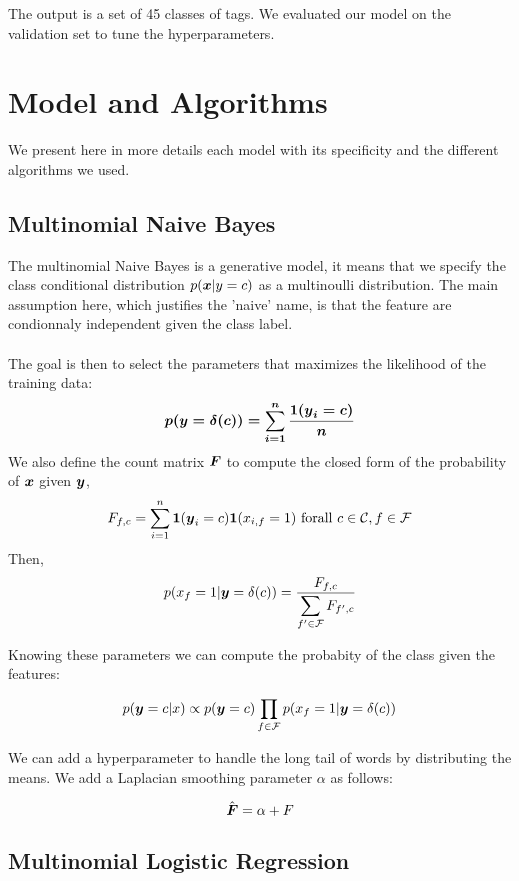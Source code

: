 \documentclass[11pt]{article}
\begin{document}
The output is a set of 45 classes of tags. We evaluated our model on the validation set to tune the hyperparameters.



\section{Model and Algorithms}

We present here in more details each model with its specificity and the different algorithms we used.

\subsection{Multinomial Naive Bayes}

The multinomial Naive Bayes \citep{murphy2012machine} is a generative model, it means that we specify the class conditional distribution $p(\boldsymbol{x} | y=c)$ as a multinoulli distribution. The main assumption here, which  justifies the 'naive' name, is that the feature are condionnaly independent given the class label.\\ \\
The goal is then to select the parameters that maximizes the likelihood of the training data:
    \[p(\boldsymbol{y} = \boldmath{\delta(c)}) = \sum_{i = 1}^n \frac{1(\boldsymbol{y}_i = c)}{n}\]
We also define the count matrix $\boldsymbol{F}$ to compute the closed form of the probability of $\boldsymbol{x}$ given $\boldsymbol{y}$,
\[F_{f,c} = \sum_{i = 1}^n \mathbf{1}(\boldsymbol{y}_i = c) \mathbf{1}(x_{i, f} = 1) \mathrm{\ for all\ } c\in \mathcal{C}, f\in \mathcal{F}\] 
Then,
      \[p(x_f = 1 | \boldsymbol{y}=\boldmath{\delta(c)}) = \frac{F_{f, c}}{\displaystyle \sum_{f' \in \mathcal{F}} F_{f',c}}  \]

\noindent Knowing these parameters we can compute the probabity of the class given the features:

\[ p(\boldsymbol{y} = c | x) \propto p(\boldsymbol{y} = c) \prod_{f \in \mathcal{F}} p(x_f = 1 | \boldsymbol{y}=\boldmath{\delta(c)})\]

\noindent We can add a hyperparameter to handle the long tail of words by distributing the means. We add a Laplacian smoothing parameter $\alpha$ as follows:

  \[\hat{\boldsymbol{F}} = \alpha + F\]

\subsection{Multinomial Logistic Regression}
\end{document}
